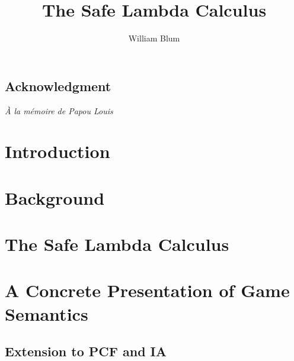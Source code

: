 \documentclass[11pt,a4paper,draft]{myown}
\author{William Blum}
\title{The Safe Lambda Calculus}
\begin{document}
\maketitle

\begin{romanpages}
\begin{abstract}

\end{abstract}

\ifacknowledgement
\chapter*{Acknowledgment}


\begin{dedication}
\emph{\`A la m\'emoire de Papou Louis}
\end{dedication}
\fi

\tableofcontents
\listoffigures
\listoftables
\end{romanpages}

\ifdraftmode\listoftodos\bigskip\fi

\chapter{Introduction}
    


\chapter{Background}
\label{chap:background}
    

\chapter{The Safe Lambda Calculus}
\label{chap:safelambda}
    
    
    
    
    
    
    


\chapter{A Concrete Presentation of Game Semantics}
    \label{chap:concrete_gamesem}
    

    \section{Extension to PCF and IA}
    
\end{document}
